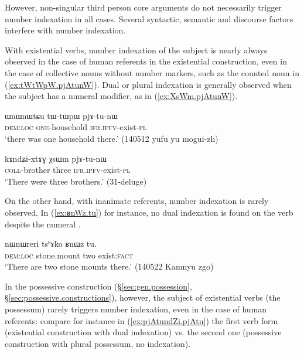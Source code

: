 However, non-singular third person core arguments do not necessarily trigger number indexation in all cases. Several syntactic, semantic and discourse factors interfere with number indexation.

With existential verbs, number indexation of the subject is nearly always observed in the case of human referents in the existential construction, even in the case of collective nouns without number markers, such as the counted noun  in (\ref{ex:tWtWpW.pjAtunW}). Dual or plural indexation is generally observed when the subject has a numeral modifier, as in (\ref{ex:XsWm.pjAtunW}). 


\begin{exe}
\ex \label{ex:tWtWpW.pjAtunW}
\gll  ɯnɯnɯtɕu tɯ-tɯpɯ pjɤ-tu-nɯ \\
\textsc{dem}:\textsc{loc} \textsc{one}-household \textsc{ifr}.\textsc{ipfv}-exist-\textsc{pl} \\
\glt `there was one household there.' (140512 yufu yu mogui-zh) 
\end{exe}

\begin{exe}
\ex \label{ex:XsWm.pjAtunW}
\gll kɤndʑi-xtɤɣ χsɯm pjɤ-tu-nɯ \\
\textsc{coll}-brother three \textsc{ifr}.\textsc{ipfv}-exist-\textsc{pl} \\
\glt `There were three brothers.' (31-deluge) 	
\end{exe}

On the other hand, with inanimate referents, number indexation is rarely observed. In (\ref{ex:ʁnWz.tu}) for instance, no dual indexation is found on the verb despite the numeral .

\begin{exe}
\ex \label{ex:ʁnWz.tu}
\gll  nɯnɯreri tsʰɤko ʁnɯz tu. \\
\textsc{dem}:\textsc{loc} stone.mount two exist:\textsc{fact} \\
\glt `There are two stone mounts there.' (140522 Kamnyu zgo) 
\end{exe}

In the possessive construction (§\ref{sec:gen.possession}, §\ref{sec:possessive.constructions}), however, the subject of existential verbs (the possessum) rarely triggers number indexation, even in the case of human referents: compare for instance in (\ref{ex:pjAtundZi.pjAtu}) the first verb form  (existential construction with dual indexation) vs. the second one  (possessive construction with plural possessum, no indexation).

